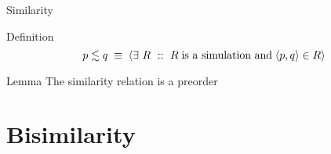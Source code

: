 \documentclass{beamer}
\begin{document}
\begin{slide}{Similarity}
\small

\begin{block}{Definition}
\[p \lesssim q\; \equiv\; \rcb{\exists}{R}{}{R\; \text{is a simulation and}\; \pair{p,q} \in R} 
\]
\end{block}
\begin{block}{Lemma}
The similarity relation is a preorder\\
\end{block}
\end{slide}


\section{Bisimilarity}
\end{document}
